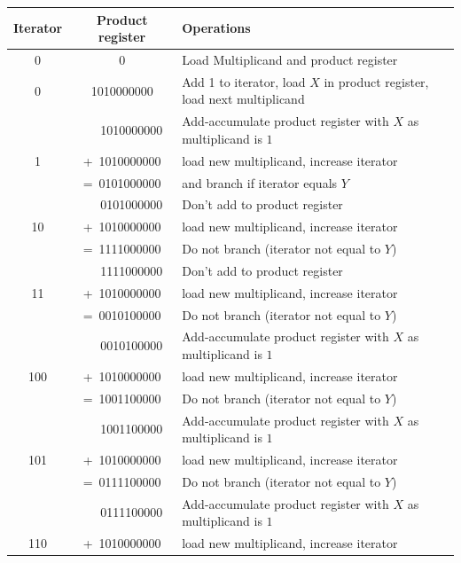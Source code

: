 \documentclass[a4paper]{report}
\begin{document}
\begin{center}
	\begin{longtable}{|c|c|l|}
		\hline
		Iterator & Product register & Operations \\
		\hline \hline
		0        & 0             & Load Multiplicand and product register \\
		\hline \hline
		0        & 1010000000    & Add 1 to iterator, load $X$ in product register, load next multiplicand \\
		\hline
		         & ~~~1010000000 & Add-accumulate product register with $X$ as multiplicand is $1$ \\
		1        &  +~1010000000 & load new multiplicand, increase iterator \\
		         &  =~0101000000 & and branch if iterator equals $Y$ \\
		\hline                  
		         & ~~~0101000000 & Don't add to product register \\
		10       &  +~1010000000 & load new multiplicand, increase iterator \\
		         &  =~1111000000 & Do not branch (iterator not equal to $Y$) \\
		\hline                  
		         & ~~~1111000000 & Don't add to product register \\
		11       &  +~1010000000 & load new multiplicand, increase iterator \\
		         &  =~0010100000 & Do not branch (iterator not equal to $Y$) \\
		\hline                  
		         & ~~~0010100000 & Add-accumulate product register with $X$ as multiplicand is $1$ \\
		100      &  +~1010000000 & load new multiplicand, increase iterator \\
		         &  =~1001100000 & Do not branch (iterator not equal to $Y$) \\
		\hline \hline           
		         & ~~~1001100000 & Add-accumulate product register with $X$ as multiplicand is $1$ \\
		101      &  +~1010000000 & load new multiplicand, increase iterator \\
		         &  =~0111100000 & Do not branch (iterator not equal to $Y$) \\
		\hline                  
		         & ~~~0111100000 & Add-accumulate product register with $X$ as multiplicand is $1$ \\
		110      &  +~1010000000 & load new multiplicand, increase iterator \\

\end{longtable}
\end{center}
\end{document}
